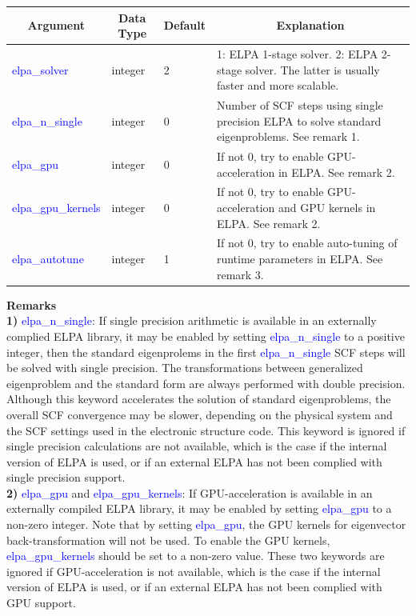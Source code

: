 \documentclass{report}
\begin{document}
\begin{tabular}[]{|p{30mm}|p{20mm}|p{15mm}|p{100mm}|}
\hline
\multicolumn{1}{|c|}{\textbf{Argument}} & \multicolumn{1}{c|}{\textbf{Data Type}} & \multicolumn{1}{c|}{\textbf{Default}} & \multicolumn{1}{c|}{\textbf{Explanation}}\\
\hline
\textcolor{blue}{elpa\_solver}       & integer & 2 & 1:  ELPA 1-stage solver.  2:  ELPA 2-stage solver.  The latter is usually faster and more scalable.\\
\hline
\textcolor{blue}{elpa\_n\_single}    & integer & 0 & Number of SCF steps using single precision ELPA to solve standard eigenproblems.  See remark 1.\\
\hline
\textcolor{blue}{elpa\_gpu}          & integer & 0 & If not 0, try to enable GPU-acceleration in ELPA.  See remark 2.\\
\hline
\textcolor{blue}{elpa\_gpu\_kernels} & integer & 0 & If not 0, try to enable GPU-acceleration and GPU kernels in ELPA.  See remark 2.\\
\hline
\textcolor{blue}{elpa\_autotune}     & integer & 1 & If not 0, try to enable auto-tuning of runtime parameters in ELPA.  See remark 3.\\
\hline
\end{tabular}

\bigskip
\textbf{Remarks}\\

\textbf{1)} \textcolor{blue}{elpa\_n\_single}:  If single precision arithmetic is available in an externally complied ELPA library, it may be enabled by setting \textcolor{blue}{elpa\_n\_single} to a positive integer, then the standard eigenprolems in the first \textcolor{blue}{elpa\_n\_single} SCF steps will be solved with single precision.  The transformations between generalized eigenproblem and the standard form are always performed with double precision.  Although this keyword accelerates the solution of standard eigenproblems, the overall SCF convergence may be slower, depending on the physical system and the SCF settings used in the electronic structure code.  This keyword is ignored if single precision calculations are not available, which is the case if the internal version of ELPA is used, or if an external ELPA has not been complied with single precision support.\\

\textbf{2)} \textcolor{blue}{elpa\_gpu} and \textcolor{blue}{elpa\_gpu\_kernels}:  If GPU-acceleration is available in an externally compiled ELPA library, it may be enabled by setting \textcolor{blue}{elpa\_gpu} to a non-zero integer.  Note that by setting \textcolor{blue}{elpa\_gpu}, the GPU kernels for eigenvector back-transformation will not be used.  To enable the GPU kernels, \textcolor{blue}{elpa\_gpu\_kernels} should be set to a non-zero value.  These two keywords are ignored if GPU-acceleration is not available, which is the case if the internal version of ELPA is used, or if an external ELPA has not been complied with GPU support.\\
\end{document}
